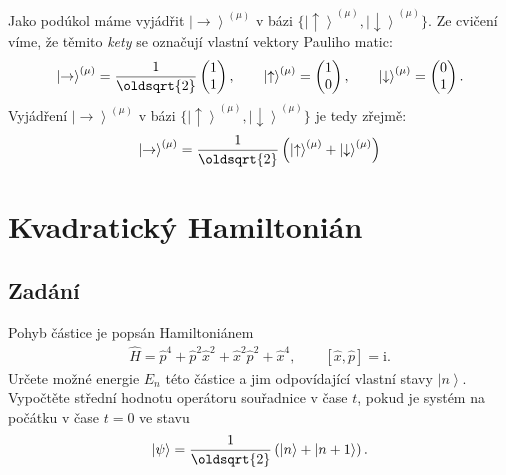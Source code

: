 \documentclass[10pt,a4paper]{article}
\newcommand{\comm}[2]{\left[ #1, #2 \right]}
\newcommand{\const}[1]{\text{#1}}
\newcommand{\mat}[1]{
    \begin{pmatrix}
        #1
    \end{pmatrix}
}
\newcommand{\ket}[1]{\left| #1 \right>}
\renewcommand{\i}{\const{i}}
\begin{document}
Jako podúkol máme vyjádřit $\ket{\rightarrow}^{(\mu)}$ v bázi $\{ \ket{\uparrow}^{(\mu)}, \ket{\downarrow}^{(\mu)} \}$. Ze cvičení víme, že těmito \textit{kety} se označují vlastní vektory Pauliho matic:
\begin{align*}
    \ket{\rightarrow}^{(\mu)} = \frac{1}{\oldsqrt{2}} \mat{1 \\ 1},
    \hspace{2em}
    \ket{\uparrow}^{(\mu)} = \mat{1 \\ 0},
    \hspace{2em}
    \ket{\downarrow}^{(\mu)} = \mat{0 \\ 1}.
\end{align*}
Vyjádření $\ket{\rightarrow}^{(\mu)}$ v bázi $\{ \ket{\uparrow}^{(\mu)}, \ket{\downarrow}^{(\mu)} \}$ je tedy zřejmě:
\begin{align*}
    \ket{\rightarrow}^{(\mu)} = \frac{1}{\oldsqrt{2}} \left(\ket{\uparrow}^{(\mu)} + \ket{\downarrow}^{(\mu)} \right)
\end{align*}


\section{Kvadratický Hamiltonián}
\subsection{Zadání}
Pohyb částice je popsán Hamiltoniánem
\begin{align*}
    \hat{H}
    = \hat{p}^4
    + \hat{p}^2 \hat{x}^2
    + \hat{x}^2 \hat{p}^2
    + \hat{x}^4,
    \hspace{2em}
    \comm{\hat{x}}{\hat{p}} = \i.
\end{align*}
Určete možné energie $E_n$ této částice a jim odpovídající vlastní stavy $\ket{n}$. Vypočtěte střední hodnotu operátoru souřadnice v čase $t$, pokud je systém na počátku v čase $t=0$ ve stavu
\begin{align*}
    \ket{\psi} =
    \frac{1}{\oldsqrt{2}}
    \left( \ket{n} + \ket{n+1} \right).
\end{align*}
\end{document}
